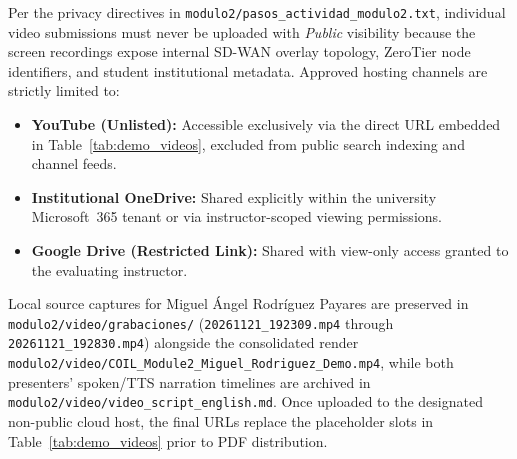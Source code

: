Per the privacy directives in \texttt{modulo2/\allowbreak pasos\_actividad\_\allowbreak modulo2.txt}, individual video submissions must never be uploaded with \textit{Public} visibility because the screen recordings expose internal SD-WAN overlay topology, ZeroTier node identifiers, and student institutional metadata. Approved hosting channels are strictly limited to:
\begin{itemize}
    \item \textbf{YouTube (Unlisted):} Accessible exclusively via the direct URL embedded in Table~\ref{tab:demo_videos}, excluded from public search indexing and channel feeds.
    \item \textbf{Institutional OneDrive:} Shared explicitly within the university Microsoft~365 tenant or via instructor-scoped viewing permissions.
    \item \textbf{Google Drive (Restricted Link):} Shared with view-only access granted to the evaluating instructor.
\end{itemize}

Local source captures for Miguel \'{A}ngel Rodr\'{i}guez Payares are preserved in \texttt{modulo2/\allowbreak video/\allowbreak grabaciones/} (\texttt{20261121\_192309.mp4} through \texttt{20261121\_192830.mp4}) alongside the consolidated render \texttt{modulo2/\allowbreak video/\allowbreak COIL\_Module2\_\allowbreak Miguel\_Rodriguez\_\allowbreak Demo.mp4}, while both presenters' spoken/TTS narration timelines are archived in \texttt{modulo2/\allowbreak video/\allowbreak video\_script\_\allowbreak english.md}. Once uploaded to the designated non-public cloud host, the final URLs replace the placeholder slots in Table~\ref{tab:demo_videos} prior to PDF distribution.
